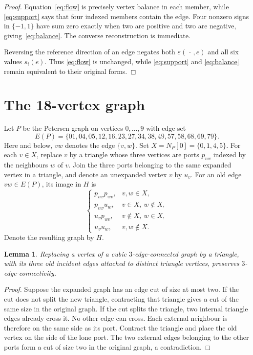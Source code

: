 \documentclass[11pt]{article}
\newtheorem{lemma}[theorem]{Lemma}
\theoremstyle{definition}
\begin{document}
\begin{proof}
Equation~\eqref{eq:flow} is precisely vertex balance in each member, while
\eqref{eq:support} says that four indexed members contain the edge.  Four
nonzero signs in $\{-1,1\}$ have sum zero exactly when two are positive and two
are negative, giving~\eqref{eq:balance}.  The converse reconstruction is
immediate.

Reversing the reference direction of an edge negates both
$\varepsilon(\,\cdot\,,e)$ and all six values $s_i(e)$.  Thus
\eqref{eq:flow} is unchanged, while \eqref{eq:support} and
\eqref{eq:balance} remain equivalent to their original forms.
\end{proof}

\section{The 18-vertex graph}

Let $P$ be the Petersen graph on vertices $0,\ldots,9$ with edge set
\begin{equation}\label{eq:petersen-edges}
E(P)=\{01,04,05,12,16,23,27,34,38,49,57,58,68,69,79\}.
\end{equation}
Here and below, $vw$ denotes the edge $\{v,w\}$.  Set
$X=N_P[0]=\{0,1,4,5\}$.  For each $v\in X$, replace $v$ by a triangle whose
three vertices are ports $p_{vw}$ indexed by the neighbours $w$ of $v$.
Join the three ports belonging to the same expanded vertex in a triangle, and
denote an unexpanded vertex $v$ by $u_v$.  For an old edge $vw\in E(P)$, its
image in $H$ is
\[
\begin{cases}
p_{vw}p_{wv}, & v,w\in X,\\
p_{vw}u_w,    & v\in X,\ w\notin X,\\
u_vp_{wv},    & v\notin X,\ w\in X,\\
u_vu_w,       & v,w\notin X.
\end{cases}
\]
Denote the resulting graph by $H$.

\begin{lemma}\label{lem:expansion}
Replacing a vertex of a cubic $3$-edge-connected graph by a triangle, with its
three old incident edges attached to distinct triangle vertices, preserves
$3$-edge-connectivity.
\end{lemma}

\begin{proof}
Suppose the expanded graph has an edge cut of size at most two.  If the cut
does not split the new triangle, contracting that triangle gives a cut of the
same size in the original graph.  If the cut splits the triangle, two internal
triangle edges already cross it.  No other edge can cross.  Each external
neighbour is therefore on the same side as its port.  Contract the triangle
and place the old vertex on the side of the lone port.  The two external edges
belonging to the other ports form a cut of size two in the original graph, a
contradiction.
\end{proof}
\end{document}
